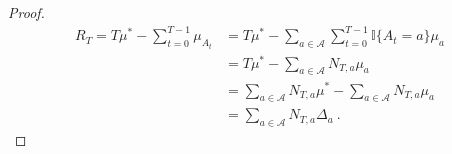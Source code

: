 \begin{proof}
  \leanok
\begin{align*}
  R_T = T \mu^* - \sum_{t=0}^{T-1} \mu_{A_t}
  &= T \mu^* - \sum_{a \in \mathcal{A}} \sum_{t=0}^{T-1} \mathbb{I}\{A_t = a\} \mu_a
  \\
  &= T \mu^* - \sum_{a \in \mathcal{A}} N_{T,a} \mu_a
  \\
  &= \sum_{a \in \mathcal{A}} N_{T,a} \mu^* - \sum_{a \in \mathcal{A}} N_{T,a} \mu_a
  \\
  &= \sum_{a \in \mathcal{A}} N_{T,a} \Delta_a
  \: .
\end{align*}
\end{proof}
